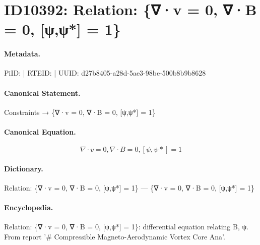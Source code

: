 \section*{ID10392: Relation: \{∇·v = 0, ∇·B = 0, [ψ,ψ*] = 1\}}
\paragraph{Metadata.}
PiID:  | RTEID:  | UUID: d27b8405-a28d-5ae3-98be-500b8b9b8628

\paragraph{Canonical Statement.}
Constraints → \{∇·v = 0, ∇·B = 0, [ψ,ψ*] = 1\}

\paragraph{Canonical Equation.}
\[
{∇·v = 0, ∇·B = 0, [ψ,ψ*] = 1}
\]

\paragraph{Dictionary.}
Relation: \{∇·v = 0, ∇·B = 0, [ψ,ψ*] = 1\} — \{∇·v = 0, ∇·B = 0, [ψ,ψ*] = 1\}

\paragraph{Encyclopedia.}
Relation: \{∇·v = 0, ∇·B = 0, [ψ,ψ*] = 1\}: differential equation relating B, ψ. From report '\# Compressible Magneto-Aerodynamic Vortex Core Ana'.
